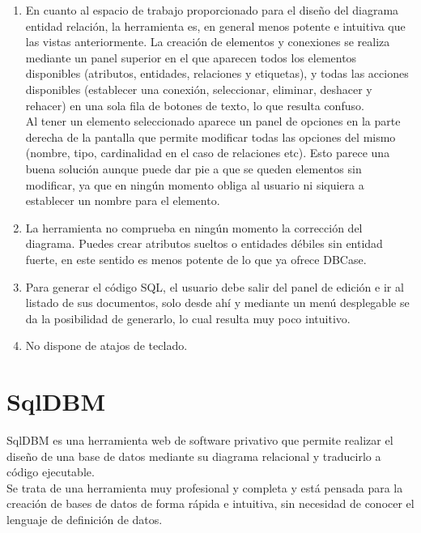 \begin{enumerate}
    \item En cuanto al espacio de trabajo proporcionado para el diseño del diagrama entidad relación, la herramienta es, en general menos potente e intuitiva que las vistas anteriormente. La creación de elementos y conexiones se realiza mediante un panel superior en el que aparecen todos los elementos disponibles (atributos, entidades, relaciones y etiquetas), y todas las acciones disponibles (establecer una conexión, seleccionar, eliminar, deshacer y rehacer) en una sola fila de botones de texto, lo que resulta confuso.\\
    
    Al tener un elemento seleccionado aparece un panel de opciones en la parte derecha de la pantalla que permite modificar todas las opciones del mismo (nombre, tipo, cardinalidad en el caso de relaciones etc). Esto parece una buena solución aunque puede dar pie a que se queden elementos sin modificar, ya que en ningún momento obliga al usuario ni siquiera a establecer un nombre para el elemento.
    
    \item La herramienta no comprueba en ningún momento la corrección del diagrama. Puedes crear atributos sueltos o entidades débiles sin entidad fuerte, en este sentido es menos potente de lo que ya ofrece DBCase.\\
    
    \item Para generar el código SQL, el usuario debe salir del panel de edición e ir al listado de sus documentos, solo desde ahí y mediante un menú desplegable se da la posibilidad de generarlo, lo cual resulta muy poco intuitivo.
    \item No dispone de atajos de teclado.
\end{enumerate}
\section{SqlDBM}
SqlDBM \cite{sqldbm} es una herramienta web de software privativo que permite realizar el diseño de una base de datos mediante su diagrama relacional y traducirlo a código ejecutable.\\

Se trata de una herramienta muy profesional y completa y está pensada para la creación de bases de datos de forma rápida e intuitiva, sin necesidad de conocer el lenguaje de definición de datos.\\


